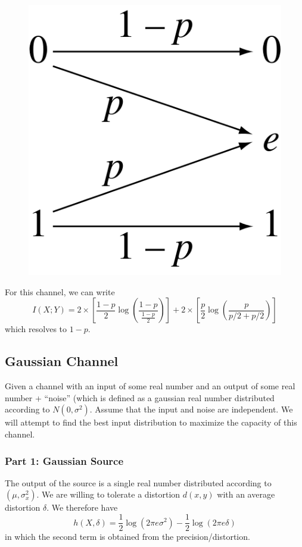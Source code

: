 \documentclass[11pt]{article}
\theoremstyle{definition}
\begin{document}
\begin{figure}[ht]
\centering
\includegraphics[scale=0.2]{binaryerasure}
\end{figure}

For this channel, we can write
$$
I(X; Y) = 2 \times \left[ \frac{1-p}{2} \log \left( \frac{1-p}{\frac{1-p}{2}} \right) \right] + 2 \times \left[ \frac{p}{2} \log \left( \frac{p}{p/2 + p/2} \right) \right]
$$
which resolves to $1-p$. 

\subsection{Gaussian Channel}
Given a channel with an input of some real number and an output of some real number + ``noise'' (which is defined as a gaussian real number distributed according to $N(0, \sigma^2)$. Assume that the input and noise are independent. We will attempt to find the best input distribution to maximize the capacity of this channel. 

\subsubsection{Part 1: Gaussian Source}

The output of the source is a single real number distributed according to $(\mu, \sigma_x^2)$. We are willing to tolerate a distortion $d(x,y)$ with an average distortion $\delta$. We therefore have $$h(X, \delta) = \frac{1}{2}\log(2\pi e \sigma^2) - \frac{1}{2} \log(2 \pi e \delta)$$in which the second term is obtained from the precision/distortion. 
\end{document}

